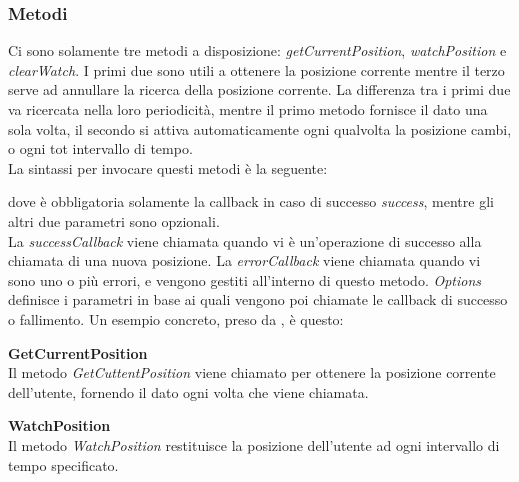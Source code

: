 \documentclass[11pt ,a4paper , twoside , openright ]{article}
\begin{document}
\subsubsection{Metodi}
Ci sono solamente tre metodi a disposizione: \textit{getCurrentPosition}, \textit{watchPosition} e \textit{clearWatch}. I primi due sono utili a ottenere la posizione corrente mentre il terzo serve ad annullare la ricerca della posizione corrente. 
La differenza tra i primi due va ricercata nella loro periodicità, mentre il primo metodo fornisce il dato una sola volta, il secondo si attiva automaticamente ogni qualvolta la posizione cambi, o ogni tot intervallo di tempo.
\\
La sintassi per invocare questi metodi è la seguente:

dove è obbligatoria solamente la callback in caso di successo \textit{success}, mentre gli altri due parametri sono opzionali.
\\
La \textit{successCallback} viene chiamata quando vi è un'operazione di successo alla chiamata di una nuova posizione.
La \textit{errorCallback} viene chiamata quando vi sono uno o più errori, e vengono gestiti all'interno di questo metodo.
\textit{Options} definisce i parametri in base ai quali vengono poi chiamate le callback di successo o fallimento.
Un esempio concreto, preso da \cite{rif5}, è questo:
\pagebreak
 


\textbf{GetCurrentPosition}
\\
Il metodo \textit{GetCuttentPosition} viene chiamato per ottenere la posizione corrente dell'utente, fornendo il dato ogni volta che viene chiamata.

\textbf{WatchPosition}
\\
Il metodo \textit{WatchPosition} restituisce la posizione dell'utente ad ogni intervallo di tempo specificato.
\end{document}
